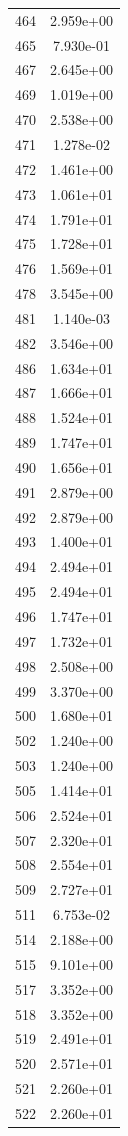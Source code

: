 \documentclass[12pt]{article}
\begin{document}
\begin{longtable}{@{}cc@{}}
464 & 2.959e+00 \\
465 & 7.930e-01 \\
467 & 2.645e+00 \\
469 & 1.019e+00 \\
470 & 2.538e+00 \\
471 & 1.278e-02 \\
472 & 1.461e+00 \\
473 & 1.061e+01 \\
474 & 1.791e+01 \\
475 & 1.728e+01 \\
476 & 1.569e+01 \\
478 & 3.545e+00 \\
481 & 1.140e-03 \\
482 & 3.546e+00 \\
486 & 1.634e+01 \\
487 & 1.666e+01 \\
488 & 1.524e+01 \\
489 & 1.747e+01 \\
490 & 1.656e+01 \\
491 & 2.879e+00 \\
492 & 2.879e+00 \\
493 & 1.400e+01 \\
494 & 2.494e+01 \\
495 & 2.494e+01 \\
496 & 1.747e+01 \\
497 & 1.732e+01 \\
498 & 2.508e+00 \\
499 & 3.370e+00 \\
500 & 1.680e+01 \\
502 & 1.240e+00 \\
503 & 1.240e+00 \\
505 & 1.414e+01 \\
506 & 2.524e+01 \\
507 & 2.320e+01 \\
508 & 2.554e+01 \\
509 & 2.727e+01 \\
511 & 6.753e-02 \\
514 & 2.188e+00 \\
515 & 9.101e+00 \\
517 & 3.352e+00 \\
518 & 3.352e+00 \\
519 & 2.491e+01 \\
520 & 2.571e+01 \\
521 & 2.260e+01 \\
522 & 2.260e+01 \\

\end{longtable}
\end{document}
